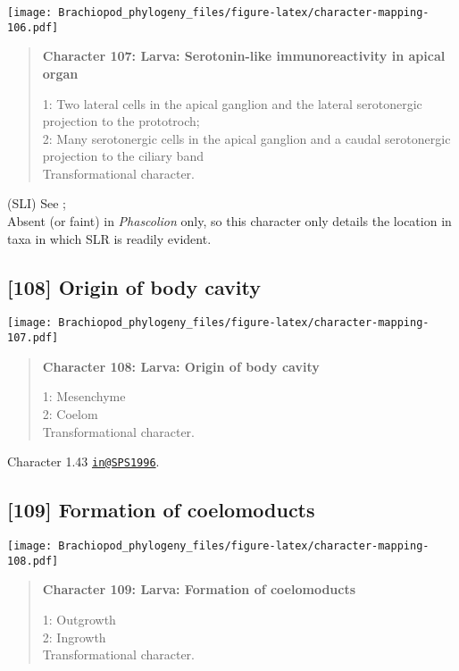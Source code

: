 \documentclass[openany]{book}
\theoremstyle{definition}
\theoremstyle{definition}
\theoremstyle{definition}
\theoremstyle{remark}
\begin{document}
\texttt{[image: Brachiopod\_phylogeny\_files/figure-latex/character-mapping-106.pdf]}

\begin{quote}
\textbf{Character 107: Larva: Serotonin-like immunoreactivity in apical
organ}

1: Two lateral cells in the apical ganglion and the lateral serotonergic
projection to the prototroch;\\
2: Many serotonergic cells in the apical ganglion and a caudal
serotonergic projection to the ciliary band\\
Transformational character.
\end{quote}

(SLI) See \citet{Haszprunar2000}; \citet{Richter2010}\\
Absent (or faint) in \emph{Phascolion} only, so this character only
details the location in taxa in which SLR is readily evident.

\subsection*{{[}108{]} Origin of body
cavity}\label{origin-of-body-cavity}

\texttt{[image: Brachiopod\_phylogeny\_files/figure-latex/character-mapping-107.pdf]}

\begin{quote}
\textbf{Character 108: Larva: Origin of body cavity}

1: Mesenchyme\\
2: Coelom\\
Transformational character.
\end{quote}

Character 1.43 \href{mailto:in@SPS1996}{\nolinkurl{in@SPS1996}}.

\subsection*{{[}109{]} Formation of
coelomoducts}\label{formation-of-coelomoducts}

\texttt{[image: Brachiopod\_phylogeny\_files/figure-latex/character-mapping-108.pdf]}

\begin{quote}
\textbf{Character 109: Larva: Formation of coelomoducts}

1: Outgrowth\\
2: Ingrowth\\
Transformational character.
\end{quote}
\end{document}
